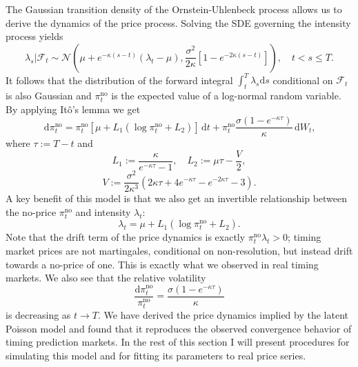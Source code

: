 \documentclass[a4paper, 12pt]{article}
\begin{document}
The Gaussian transition density of the Ornstein-Uhlenbeck process allows us to derive the dynamics of the price process. Solving the SDE governing the intensity process yields
\begin{equation*}
  \lambda _s \vert \mathcal{F}_t \sim \mathcal{N}\left(\mu + e^{-\kappa (s-t)}(\lambda_t-\mu ), \frac{\sigma^2}{2\kappa }\left[1-e^{-2\kappa (s-t)} \right]\right), \quad t<s\leq T.
\end{equation*}
It follows that the distribution of the forward integral \(\int_t^T \lambda_s \mathrm{d}s\) conditional on \(\mathcal{F}_t\) is also Gaussian and \(\pi_t^\text{no}\) is the expected value of a log-normal random variable. By applying Itô's lemma we get 
\begin{equation*}
  \,\mathrm{d}\pi^\text{no}_t = \pi^\text{no}_t\left[ \mu +L_1(\log\pi^\text{no}_t + L_2) \right]\,\mathrm{d}t + \pi^\text{no}_t \frac{\sigma (1 - e^{-\kappa \tau })}{\kappa }\,\mathrm{d}W_t,
\end{equation*}
where \(\tau := T-t\) and 
\begin{equation*} 
  L_1 := \frac{\kappa }{e^{-\kappa \tau }-1}, \quad L_2:=\mu \tau -\frac{V}{2},
\end{equation*}
\begin{equation*}
V := \frac{\sigma ^2}{2\kappa ^3}\left( 2\kappa \tau +4e^{-\kappa \tau }-e^{-2\kappa \tau } - 3 \right).
\end{equation*}
A key benefit of this model is that we also get an invertible relationship between the no-price \(\pi_t^\text{no}\) and intensity \(\lambda_t\):
\begin{equation*}
  \lambda_t = \mu + L_1(\log\pi_t^\text{no} + L_2). 
\end{equation*}
Note that the drift term of the price dynamics is exactly \(\pi_t^\text{no}\lambda_t > 0\); timing market prices are not martingales, conditional on non-resolution, but instead drift towards a no-price of one. This is exactly what we observed in real timing markets. We also see that the relative volatility 
\begin{equation*}
  \frac{\mathrm{d}\pi_t^\text{no}}{\pi_t^\text{no}} = \frac{\sigma(1-e^{-\kappa \tau})}{\kappa}
\end{equation*}
is decreasing as \(t \rightarrow T\). We have derived the price dynamics implied by the latent Poisson model and found that it reproduces the observed convergence behavior of timing prediction markets. In the rest of this section I will present procedures for simulating this model and for fitting its parameters to real price series.
\end{document}
